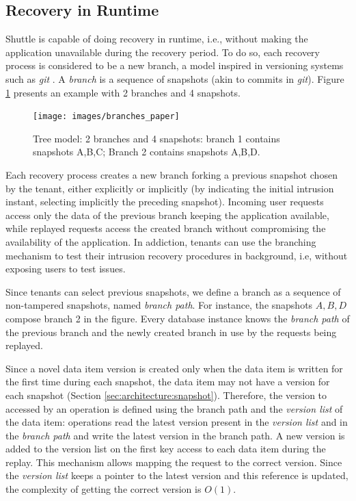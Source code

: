 \subsection{Recovery in Runtime}
\label{sec:recovery:runtime_recovery}
Shuttle is capable of doing recovery in runtime, i.e., without making the application unavailable during the recovery period. To do so, each recovery process is considered to be a new branch, a model inspired in versioning systems such as \emph{git} \cite{git}. A \emph{branch} is a sequence of snapshots (akin to commits in \emph{git}). Figure \ref{fig:branches} presents an example with 2 branches and 4 snapshots.

\begin{figure}
  \centering
  \texttt{[image: images/branches\_paper]}
  \caption{\footnotesize{Tree model:} 2 branches and 4 snapshots: branch 1 contains snapshots A,B,C; Branch 2 contains snapshots A,B,D.} %
  \label{fig:branches}
\end{figure}

Each recovery process creates a new branch forking a previous snapshot chosen by the tenant, either explicitly or implicitly (by indicating the initial intrusion instant, selecting implicitly the preceding snapshot). Incoming user requests access only the data of the previous branch keeping the application available, while replayed requests access the created branch without compromising the availability of the application. In addiction, tenants can use the branching mechanism to test their intrusion recovery procedures in background, i.e, without exposing users to test issues.

Since tenants can select previous snapshots, we define a branch as a sequence of non-tampered snapshots, named \emph{branch path}. For instance, the snapshots $A,B,D$ compose  branch 2 in the figure. Every database instance knows the \emph{branch path} of the previous branch and the newly created branch in use by the requests being replayed.

Since a novel data item version is created only when the data item is written for the first time during each snapshot, the data item may not have a version for each snapshot (Section \ref{sec:architecture:snapshot}). Therefore, the version to accessed by an operation is defined using the branch path and the \emph{version list} of the data item: operations read the latest version present in the \emph{version list} and in the \emph{branch path} and write the latest version in the branch path. A new version is added to the version list on the first key access to each data item during the replay. This mechanism allows mapping the request to the correct version. Since the \emph{version list} keeps a pointer to the latest version and this reference is updated, the complexity of getting the correct version is $O(1)$. 

